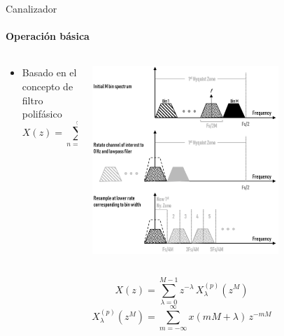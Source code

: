\documentclass[ignorenonframetext,12pt]{beamer}
\begin{document}
\begin{frame}{Canalizador}
				\framesubtitle{Operación básica}
				\begin{columns}
								\begin{column}{0.5\textwidth}
												\begin{itemize}
																\item Basado en el concepto de filtro polifásico
																				\begin{equation*}\label{eq_transformada_z}
																								X(z) = \sum_{n = -\infty}^{\infty}x(n)\,z^{-n}
																				\end{equation*}


												\end{itemize}
								\end{column}
								\begin{column}{0.5\textwidth}
												\centering
												\includegraphics[width=0.7\textwidth]{pfb_basic1}
								\end{column}
				\end{columns}
																				\begin{equation*}\label{eq_transformada_z_polifasica}
																								X(z) = \sum_{\lambda =
																								0}^{M-1}z^{-\lambda}\,X_\lambda^{(p)}(z^{M})
																				\end{equation*}
																				{\color{blue}\begin{equation*}\label{eq_x_polifasica}
																								X_\lambda^{(p)}(z^{M}) = \sum_{m =-\infty}^{\infty}x(mM+\lambda)\,z^{-mM}
																				\end{equation*}}


\end{frame}
\end{document}
